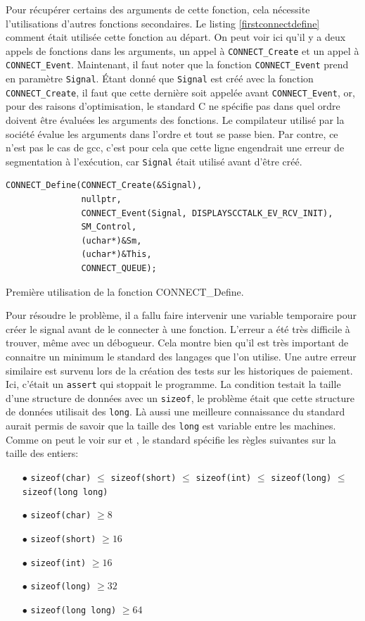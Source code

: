 \documentclass[a4paper]{article}
\begin{document}
Pour récupérer certains des arguments de cette fonction, cela nécessite
l'utilisations d'autres fonctions secondaires. Le listing
\ref{firstconnectdefine} comment était utilisée cette fonction au départ. On
peut voir ici qu'il y a deux appels de fonctions dans les arguments, un appel à
\verb|CONNECT_Create| et un appel à \verb|CONNECT_Event|. Maintenant, il faut
noter que la fonction \verb|CONNECT_Event| prend en paramètre \verb|Signal|.
Étant donné que \verb|Signal| est créé avec la fonction \verb|CONNECT_Create|,
il faut que cette dernière soit appelée avant \verb|CONNECT_Event|, or, pour
des raisons d'optimisation, le standard C ne spécifie pas dans quel ordre
doivent être évaluées les arguments des fonctions. Le compilateur utilisé par la
société évalue les arguments dans l'ordre et tout se passe bien. Par contre, ce
n'est pas le cas de gcc, c'est pour cela que cette ligne engendrait une erreur
de segmentation à l'exécution, car \verb|Signal| était utilisé avant d'être
créé.

\begin{listing}[ht!]
\begin{verbatim}
CONNECT_Define(CONNECT_Create(&Signal),
               nullptr,
               CONNECT_Event(Signal, DISPLAYSCCTALK_EV_RCV_INIT),
               SM_Control,
               (uchar*)&Sm,
               (uchar*)&This,
               CONNECT_QUEUE);
\end{verbatim}
\caption{Première utilisation de la fonction CONNECT\_Define.}
\label{firstconnectdefine}
\end{listing}

Pour résoudre le problème, il a fallu faire intervenir une variable temporaire
pour créer le signal avant de le connecter à une fonction. L'erreur a été très
difficile à trouver, même avec un débogueur. Cela montre bien qu'il est très
important de connaitre un minimum le standard des langages que l'on utilise. Une
autre erreur similaire est survenu lors de la création des tests sur les
historiques de paiement. Ici, c'était un \verb|assert| qui stoppait le
programme. La condition testait la taille d'une structure de données avec un
\verb|sizeof|, le problème était que cette structure de données utilisait des
\verb|long|. Là aussi une meilleure connaissance du standard aurait permis de
savoir que la taille des \verb|long| est variable entre les machines. Comme on
peut le voir sur \cite{ISO:C99} et \cite{typescppref}, le standard spécifie les
règles suivantes sur la taille des entiers:

\begin{itemize}
  \item[$\bullet$] \verb|sizeof(char)| $\leq$ \verb|sizeof(short)| $\leq$ \verb|sizeof(int)| $\leq$ \verb|sizeof(long)| $\leq$ \verb|sizeof(long long)|
  \item[$\bullet$] \verb|sizeof(char)| $\geq 8$
  \item[$\bullet$] \verb|sizeof(short)| $\geq 16$
  \item[$\bullet$] \verb|sizeof(int)| $\geq 16$
  \item[$\bullet$] \verb|sizeof(long)| $\geq 32$
  \item[$\bullet$] \verb|sizeof(long long)| $\geq 64$
\end{itemize}
\end{document}
